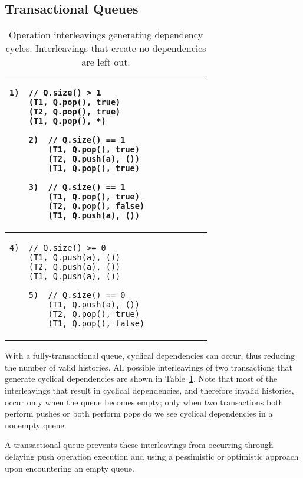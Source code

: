 \subsection{Transactional Queues}

\begin{table}
    \centering
    \begin{tabular}{|l|}
        \hline
\begin{lstlisting}
1)  // Q.size() > 1 
    (T1, Q.pop(), true)        
    (T2, Q.pop(), true)        
    (T1, Q.pop(), *)
\end{lstlisting}
\begin{lstlisting}
    2)  // Q.size() == 1  
        (T1, Q.pop(), true)     
        (T2, Q.push(a), ())             
        (T1, Q.pop(), true)
    \end{lstlisting}
    \begin{lstlisting}
    3)  // Q.size() == 1  
        (T1, Q.pop(), true)     
        (T2, Q.pop(), false)     
        (T1, Q.push(a), ())             
\end{lstlisting}
    \\
    \hline
\begin{lstlisting}
4)  // Q.size() >= 0 
    (T1, Q.push(a), ())
    (T2, Q.push(a), ())             
    (T1, Q.push(a), ())             
\end{lstlisting}
    \begin{lstlisting}
    5)  // Q.size() == 0 
        (T1, Q.push(a), ())             
        (T2, Q.pop(), true)
        (T1, Q.pop(), false)
\end{lstlisting}
\\
        \hline
\end{tabular}
    \caption{Operation interleavings generating dependency cycles. Interleavings that create no dependencies are left out.}
    \label{tab:interleavings}
\end{table}

With a fully-transactional queue, cyclical dependencies can occur, thus reducing the number of valid histories. All possible interleavings of two transactions that generate cyclical dependencies are shown in Table~\ref{tab:interleavings}. Note that most of the interleavings that result in cyclical dependencies, and therefore invalid histories, occur only when the queue becomes empty; only when two transactions both perform pushes or both perform pops do we see cyclical dependencies in a nonempty queue. 

A transactional queue prevents these interleavings from occurring through delaying push operation execution and using a pessimistic or optimistic approach upon encountering an empty queue.

